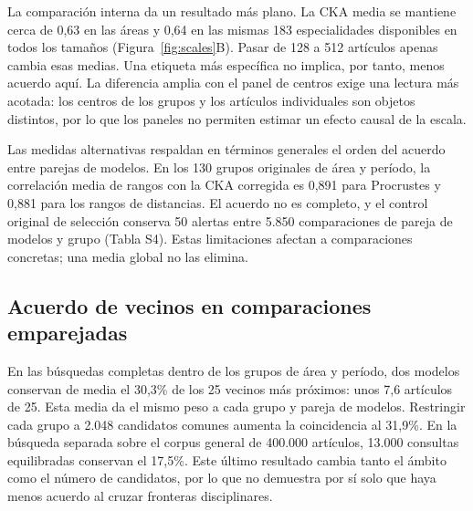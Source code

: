 \documentclass[12pt]{article}
\begin{document}
La comparación interna da un resultado más plano. La CKA media se mantiene cerca de 0,63 en las áreas y 0,64 en las mismas 183 especialidades disponibles en todos los tamaños (Figura~\ref{fig:scales}B). Pasar de 128 a 512 artículos apenas cambia esas medias. Una etiqueta más específica no implica, por tanto, menos acuerdo aquí. La diferencia amplia con el panel de centros exige una lectura más acotada: los centros de los grupos y los artículos individuales son objetos distintos, por lo que los paneles no permiten estimar un efecto causal de la escala.

Las medidas alternativas respaldan en términos generales el orden del acuerdo entre parejas de modelos. En los 130 grupos originales de área y período, la correlación media de rangos con la CKA corregida es 0,891 para Procrustes y 0,881 para los rangos de distancias. El acuerdo no es completo, y el control original de selección conserva 50 alertas entre 5.850 comparaciones de pareja de modelos y grupo (Tabla S4). Estas limitaciones afectan a comparaciones concretas; una media global no las elimina.

\subsection{Acuerdo de vecinos en comparaciones emparejadas}
En las búsquedas completas dentro de los grupos de área y período, dos modelos conservan de media el 30,3\% de los 25 vecinos más próximos: unos 7,6 artículos de 25. Esta media da el mismo peso a cada grupo y pareja de modelos. Restringir cada grupo a 2.048 candidatos comunes aumenta la coincidencia al 31,9\%. En la búsqueda separada sobre el corpus general de 400.000 artículos, 13.000 consultas equilibradas conservan el 17,5\%. Este último resultado cambia tanto el ámbito como el número de candidatos, por lo que no demuestra por sí solo que haya menos acuerdo al cruzar fronteras disciplinares.
\end{document}
